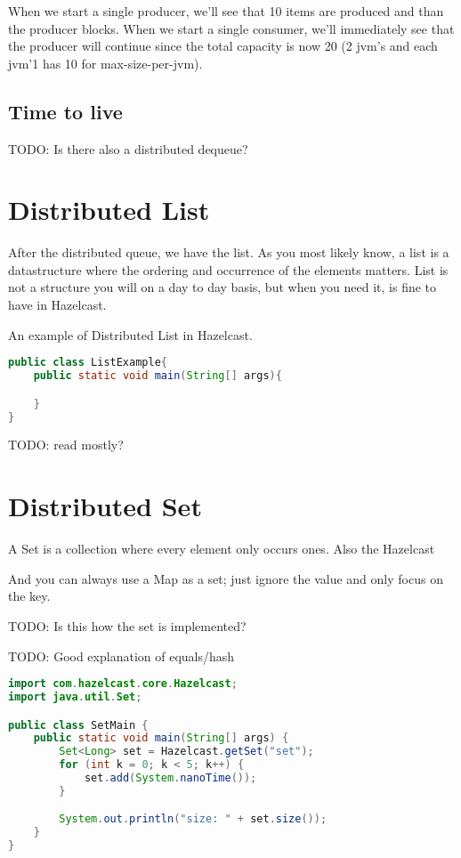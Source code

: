 When we start a single producer, we'll see that 10 items are produced and than the producer
blocks. When we start a single consumer, we'll immediately see that the producer will continue
since the total capacity is now 20 (2 jvm's and each jvm'1 has 10 for max-size-per-jvm). 

\subsection{Time to live}
TODO: Is there also a distributed dequeue?

\section{Distributed List}

After the distributed queue, we have the list. As you most likely know, a list is a 
datastructure where the ordering and occurrence of the elements matters. List is not a 
structure you will on a day to day basis, but when you need it, is fine to have in Hazelcast.

An example of Distributed List in Hazelcast.

\begin{lstlisting}[language=java]
public class ListExample{
    public static void main(String[] args){

    }
}
\end{lstlisting}

TODO: read mostly?

\section{Distributed Set}

A Set is a collection where every element only occurs ones. Also the Hazelcast

And you can always use a Map as a set; just ignore the value and only focus on the key.

TODO: Is this how the set is implemented?

TODO: Good explanation of equals/hash

\begin{lstlisting}[language=java]
import com.hazelcast.core.Hazelcast;
import java.util.Set;

public class SetMain {
    public static void main(String[] args) {
        Set<Long> set = Hazelcast.getSet("set");
        for (int k = 0; k < 5; k++) {
            set.add(System.nanoTime());
        }

        System.out.println("size: " + set.size());
    }
}
\end{lstlisting}

